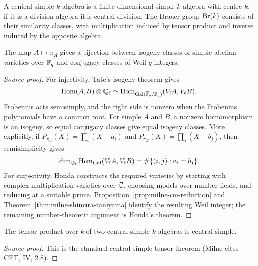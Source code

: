 \begin{definition}\label{def:milne-central-simple}
A central simple $k$-algebra is a finite-dimensional simple $k$-algebra with
centre $k$; if it is a division algebra it is central division. The Brauer
group $\operatorname{Br}(k)$ consists of their similarity classes, with multiplication
induced by tensor product and inverse induced by the opposite algebra.
\end{definition}

\begin{theorem}\label{thm:milne-honda-tate}
The map $A\mapsto\pi_A$ gives a bijection between isogeny classes of simple abelian varieties over $\mathbb{F}_q$ and conjugacy classes of Weil $q$-integers.
\end{theorem}

\begin{proof}[Source proof]

For injectivity, Tate's isogeny theorem gives
\[
 \operatorname{Hom}(A,B)\otimes\mathbb{Q}_\ell\simeq
 \operatorname{Hom}_{\operatorname{Gal}(\overline{\mathbb{F}}_q/\mathbb{F}_q)}(V_\ell A,V_\ell B).
\]
Frobenius acts semisimply, and the right side is nonzero when the Frobenius
polynomials have a common root. For simple $A$ and $B$, a nonzero homomorphism
is an isogeny, so equal conjugacy classes give equal isogeny classes.
More explicitly, if
$P_{\pi_A}(X)=\prod_i(X-a_i)$ and
$P_{\pi_B}(X)=\prod_j(X-b_j)$, then semisimplicity gives
\[
 \dim_{\mathbb{Q}_\ell}\operatorname{Hom}_{\operatorname{Gal}}(V_\ell A,V_\ell B)
 =\#\{(i,j):a_i=b_j\}.
\]
For surjectivity, Honda constructs the required varieties by starting with
complex-multiplication varieties over $\mathbb{C}$, choosing models over number fields,
and reducing at a suitable prime. Proposition~\ref{prop:milne-cm-reduction}
and Theorem~\ref{thm:milne-shimura-taniyama} identify the resulting Weil
integer; the remaining number-theoretic argument is Honda's theorem.

\end{proof}

\begin{lemma}\label{lem:milne-central-simple-tensor}
The tensor product over $k$ of two central simple $k$-algebras is central simple.
\end{lemma}

\begin{proof}[Source proof]

This is the standard central-simple tensor theorem (Milne cites CFT, IV, 2.8).

\end{proof}

